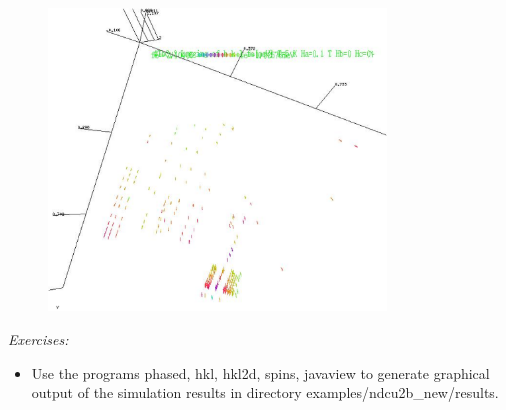 \begin{figure}[hb]%
\begin{center}\leavevmode
\includegraphics[angle=0, width=0.8\textwidth]{../demo/pictures/felog.eps}
\end{center}
\end{figure}

\vspace{1cm}
{\em Exercises:}
\begin{itemize}
\item Use the programs {\prg phased, hkl, hkl2d, spins, javaview} to generate
graphical output of the simulation results in directory 
{\prg examples/ndcu2b\_new/results}.
\end{itemize}


